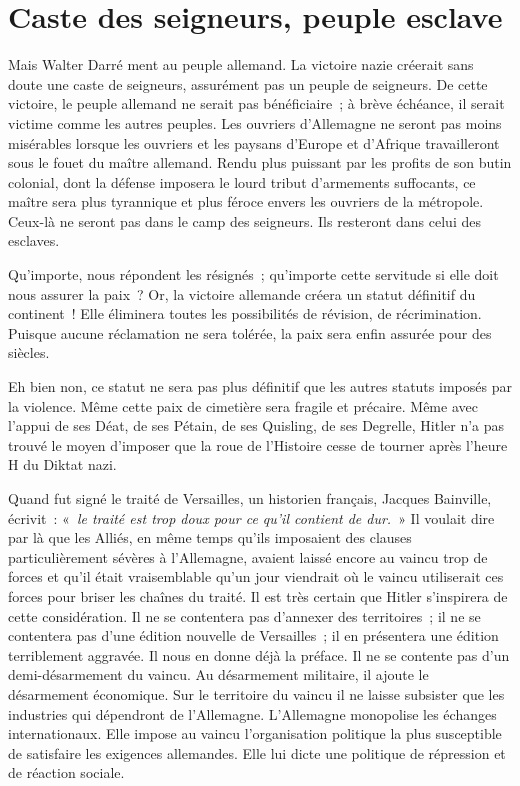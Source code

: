 \documentclass[french,twoside]{book} %
\begin{document}
\section[Caste des seigneurs, peuple esclave]{Caste des seigneurs, peuple esclave}
\noindent Mais Walter Darré ment au peuple allemand. La victoire nazie créerait sans doute une caste de seigneurs, assurément pas un peuple de seigneurs. De cette victoire, le peuple allemand ne serait pas bénéficiaire ; à brève échéance, il serait victime comme les autres peuples. Les ouvriers d’Allemagne ne seront pas moins misérables lorsque les ouvriers et les paysans d’Europe et d’Afrique travailleront sous le fouet du maître allemand. Rendu plus puissant par les profits de son butin colonial, dont la défense imposera le lourd tribut d’armements suffocants, ce maître sera plus tyrannique et plus féroce envers les ouvriers de la métropole. Ceux-là ne seront pas dans le camp des seigneurs. Ils resteront dans celui des esclaves.\par
Qu’importe, nous répondent les résignés ; qu’importe cette servitude si elle doit nous assurer la paix ? Or, la victoire allemande créera un statut définitif du continent ! Elle éliminera toutes les possibilités de révision, de récrimination. Puisque aucune réclamation ne sera tolérée, la paix sera enfin assurée pour des siècles.\par
Eh bien non, ce statut ne sera pas plus définitif que les autres statuts imposés par la violence. Même cette paix de cimetière sera fragile et précaire. Même avec l’appui de ses Déat, de ses Pétain, de ses Quisling, de ses Degrelle, Hitler n’a pas trouvé le moyen d’imposer que la roue de l’Histoire cesse de tourner après l’heure H du Diktat nazi.\par
Quand fut signé le traité de Versailles, un historien français, Jacques Bainville, écrivit : « \emph{le traité est trop doux pour ce qu’il contient de dur.} » Il voulait dire par là que les Alliés, en même temps qu’ils imposaient des clauses particulièrement sévères à l’Allemagne, avaient laissé encore au vaincu trop de forces et qu’il était vraisemblable qu’un jour viendrait où le vaincu utiliserait ces forces pour briser les chaînes du traité. Il est très certain que Hitler s’inspirera de cette considération. Il ne se contentera pas d’annexer des territoires ; il ne se contentera pas d’une édition nouvelle de Versailles ; il en présentera une édition terriblement aggravée. Il nous en donne déjà la préface. Il ne se contente pas d’un demi-désarmement du vaincu. Au désarmement militaire, il ajoute le désarmement économique. Sur le territoire du vaincu il ne laisse subsister que les industries qui dépendront de l’Allemagne. L’Allemagne monopolise les échanges internationaux. Elle impose au vaincu l’organisation politique la plus susceptible de satisfaire les exigences allemandes. Elle lui dicte une politique de répression et de réaction sociale.
\end{document}
